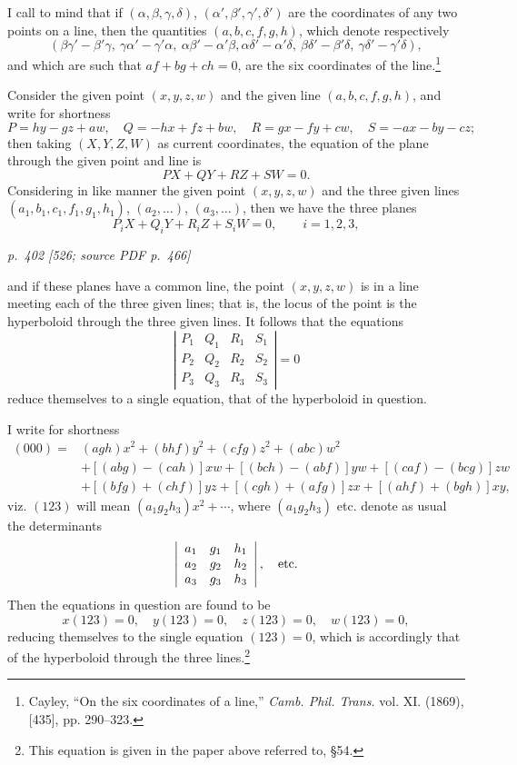 \documentclass[11pt,a4paper]{article}
\newcommand{\pagemarker}[3]{\par\bigskip\noindent\textit{p.~#1 [#2; source PDF p.~#3]}\par\smallskip}
\begin{document}
I call to mind that if $(\alpha,\beta,\gamma,\delta)$,
$(\alpha',\beta',\gamma',\delta')$ are the coordinates of any two points on a line, then
the quantities $(a,b,c,f,g,h)$, which denote respectively
\[
(\beta\gamma'-\beta'\gamma,\ \gamma\alpha'-\gamma'\alpha,\ \alpha\beta'-\alpha'\beta,
\alpha\delta'-\alpha'\delta,\ \beta\delta'-\beta'\delta,\ \gamma\delta'-\gamma'\delta),
\]
and which are such that $af+bg+ch=0$, are the six coordinates of the line.\footnote{Cayley,
``On the six coordinates of a line,'' \textit{Camb. Phil. Trans.} vol. XI. (1869), [435],
pp. 290--323.}

Consider the given point $(x,y,z,w)$ and the given line $(a,b,c,f,g,h)$, and write
for shortness
\[
P=hy-gz+aw,\quad Q=-hx+fz+bw,\quad R=gx-fy+cw,\quad S=-ax-by-cz;
\]
then taking $(X,Y,Z,W)$ as current coordinates, the equation of the plane through
the given point and line is
\[
PX+QY+RZ+SW=0.
\]
Considering in like manner the given point $(x,y,z,w)$ and the three given lines
$(a_1,b_1,c_1,f_1,g_1,h_1)$, $(a_2,\ldots)$, $(a_3,\ldots)$, then we have the three
planes
\[
P_iX+Q_iY+R_iZ+S_iW=0,\qquad i=1,2,3,
\]

\pagemarker{402}{526}{466}

and if these planes have a common line, the point $(x,y,z,w)$ is in a line meeting
each of the three given lines; that is, the locus of the point is the hyperboloid
through the three given lines. It follows that the equations
\[
\left|\begin{array}{cccc}
P_1&Q_1&R_1&S_1\\
P_2&Q_2&R_2&S_2\\
P_3&Q_3&R_3&S_3
\end{array}\right|=0
\]
reduce themselves to a single equation, that of the hyperboloid in question.

I write for shortness
\[
\begin{aligned}
(000)={}&(agh)x^2+(bhf)y^2+(cfg)z^2+(abc)w^2\\
&+[(abg)-(cah)]xw+[(bch)-(abf)]yw+[(caf)-(bcg)]zw\\
&+[(bfg)+(chf)]yz+[(cgh)+(afg)]zx+[(ahf)+(bgh)]xy,
\end{aligned}
\]
viz. $(123)$ will mean $(a_1g_2h_3)x^2+\cdots$, where $(a_1g_2h_3)$ etc. denote as
usual the determinants
\[
\left|\begin{array}{ccc}
a_1&g_1&h_1\\
a_2&g_2&h_2\\
a_3&g_3&h_3
\end{array}\right|,\quad\hbox{etc.}
\]
Then the equations in question are found to be
\[
x(123)=0,\quad y(123)=0,\quad z(123)=0,\quad w(123)=0,
\]
reducing themselves to the single equation $(123)=0$, which is accordingly that of
the hyperboloid through the three lines.\footnote{This equation is given in the paper
above referred to, \S 54.}
\end{document}
